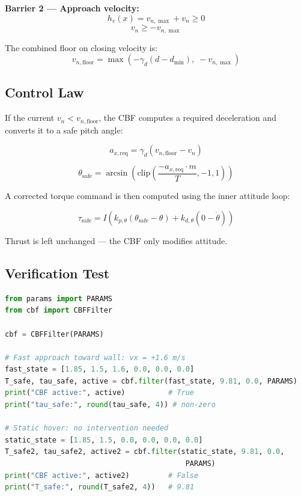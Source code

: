 \documentclass[12pt]{article}
\begin{document}
\textbf{Barrier 2 — Approach velocity:}
\begin{equation}
    h_v(x) = v_{n,\max} + v_n \geq 0
\end{equation}
\begin{equation}
    v_n \geq -v_{n,\max}
\end{equation}

The combined floor on closing velocity is:
\begin{equation}
    v_{n,\mathrm{floor}} = \max\left(-\gamma_d(d - d_{\min}),\;
    -v_{n,\max}\right)
\end{equation}

\subsection{Control Law}

If the current $v_n < v_{n,\mathrm{floor}}$, the CBF computes a
required deceleration and converts it to a safe pitch angle:

\begin{equation}
    a_{x,\mathrm{req}} = \gamma_d(v_{n,\mathrm{floor}} - v_n)
\end{equation}

\begin{equation}
    \theta_\mathrm{safe} = \arcsin\!\left(
    \mathrm{clip}\!\left(\frac{-a_{x,\mathrm{req}} \cdot m}{T},
    -1, 1\right)\right)
\end{equation}

A corrected torque command is then computed using the inner attitude
loop:

\begin{equation}
    \tau_\mathrm{safe} = I\left(k_{p,\theta}(\theta_\mathrm{safe}
    - \theta) + k_{d,\theta}(0 - \dot{\theta})\right)
\end{equation}

Thrust is left unchanged — the CBF only modifies attitude.

\subsection{Verification Test}

\begin{lstlisting}[language=Python]
from params import PARAMS
from cbf import CBFFilter

cbf = CBFFilter(PARAMS)

# Fast approach toward wall: vx = +1.6 m/s
fast_state = [1.85, 1.5, 1.6, 0.0, 0.0, 0.0]
T_safe, tau_safe, active = cbf.filter(fast_state, 9.81, 0.0, PARAMS)
print("CBF active:", active)          # True
print("tau_safe:", round(tau_safe, 4)) # non-zero

# Static hover: no intervention needed
static_state = [1.85, 1.5, 0.0, 0.0, 0.0, 0.0]
T_safe2, tau_safe2, active2 = cbf.filter(static_state, 9.81, 0.0,
                                          PARAMS)
print("CBF active:", active2)         # False
print("T_safe:", round(T_safe2, 4))   # 9.81
\end{lstlisting}
\end{document}
